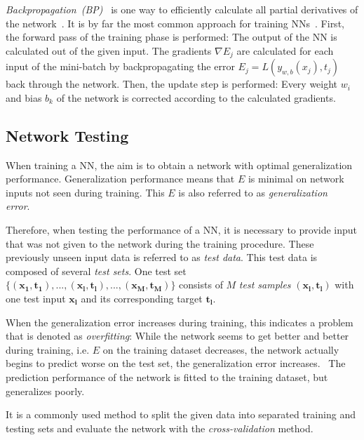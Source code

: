 \emph{Backpropagation~(BP)}~\cite{rumelhart1986origin_backprop_paper} is one way to efficiently calculate all partial derivatives of the network~\cite{backprop_grad_desc_closed1993shun}.
It is by far the most common approach for training NNs~\cite{hernandez_adams2015prob_backprop}.
First, the forward pass of the training phase is performed: The output of the NN is calculated out of the given input.
The gradients $\nabla E_j$ are calculated for each input of the mini-batch by backpropagating the error $E_j=L(y_{w,b}(x_j), t_j)$ back through the network. Then, the update step is performed: Every weight $w_i$ and bias $b_k$ of the network is corrected according to the calculated gradients.~\cite{rumelhart1986origin_backprop_paper}~\cite{buscema1998backprop_network}  

\subsection{Network Testing}
\label{nn:testing}

When training a NN, the aim is to obtain a network with optimal generalization performance. Generalization performance means that $E$ is minimal on network inputs not seen during training. This $E$ is also referred to as \emph{generalization error}.~\cite{cross_val_overfit1998prechelt}

Therefore, when testing the performance of a NN, it is necessary to provide input that was not given to the network during the training procedure. These previously unseen input data is referred to as \emph{test data}.
This test data is composed of several \emph{test sets}. One test set $\{(\mathbf{x_1},\mathbf{t_1}),...,(\mathbf{x_l},\mathbf{t_l}),...,(\mathbf{x_M},\mathbf{t_M})\}$ consists of $M$ \emph{test samples} $(\mathbf{x_l},\mathbf{t_l})$ with one test input $\mathbf{x_l}$ and its corresponding target $\mathbf{t_l}$.

When the generalization error increases during training, this indicates a problem that is denoted as \emph{overfitting}: While the network seems to get better and better during training, i.e. $E$ on the training dataset decreases, the network actually begins to predict worse on the test set, the generalization error increases.~\cite{cross_val_overfit1998prechelt}
The prediction performance of the network is fitted to the training dataset, but generalizes poorly.

It is a commonly used method to split the given data into separated training and testing sets and evaluate the network with the \emph{cross-validation} method. 

